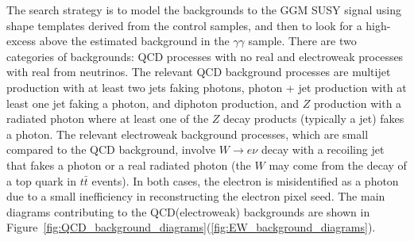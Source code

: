\documentclass[dissertation.tex]{subfiles}
\begin{document}
The search strategy is to model the backgrounds to the GGM SUSY signal using \MET shape templates derived from the control samples, and then to look for a high-\MET excess above the estimated background in the $\gamma\gamma$ sample.  There are two categories of backgrounds: QCD processes with no real \MET and electroweak processes with real \MET from neutrinos.  The relevant QCD background processes are multijet production with at least two jets faking photons, photon + jet production with at least one jet faking a photon, and diphoton production, and $Z$ production with a radiated photon where at least one of the $Z$ decay products (typically a jet) fakes a photon.  The relevant electroweak background processes, which are small compared to the QCD background, involve $W\rightarrow e\nu$ decay with a recoiling jet that fakes a photon or a real radiated photon (the $W$ may come from the decay of a top quark in $t\bar{t}$ events).  In both cases, the electron is misidentified as a photon due to a small inefficiency in reconstructing the electron pixel seed.  The main diagrams contributing to the QCD(electroweak) backgrounds are shown in Figure~\ref{fig:QCD_background_diagrams}(\ref{fig:EW_background_diagrams}).
\end{document}
